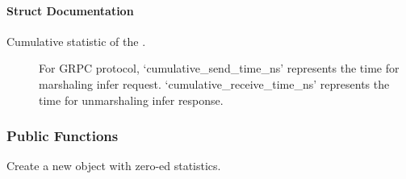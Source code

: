 \documentclass[letterpaper,10pt,english]{sphinxmanual}
\begin{document}
\paragraph{Struct Documentation}
\label{\detokenize{cpp_api/structnvidia_1_1inferenceserver_1_1client_1_1InferContext_1_1Stat:struct-documentation}}

\begin{fulllineitems}
\label{\detokenize{cpp_api/structnvidia_1_1inferenceserver_1_1client_1_1InferContext_1_1Stat:_CPPv4N6nvidia15inferenceserver6client12InferContext4StatE}}%
\pysigstartmultiline
{}\label{\detokenize{cpp_api/structnvidia_1_1inferenceserver_1_1client_1_1InferContext_1_1Stat:structnvidia_1_1inferenceserver_1_1client_1_1InferContext_1_1Stat}}%
\pysigstopmultiline
Cumulative statistic of the {\hyperref[\detokenize{cpp_api/classnvidia_1_1inferenceserver_1_1client_1_1InferContext:classnvidia_1_1inferenceserver_1_1client_1_1InferContext}]{}}. 

\begin{description}
\item[{}] \leavevmode
For GRPC protocol, ‘cumulative\_send\_time\_ns’ represents the time for marshaling infer request. ‘cumulative\_receive\_time\_ns’ represents the time for unmarshaling infer response. 

\end{description}

\subsubsection*{Public Functions}

\begin{fulllineitems}
\label{\detokenize{cpp_api/structnvidia_1_1inferenceserver_1_1client_1_1InferContext_1_1Stat:_CPPv4N6nvidia15inferenceserver6client12InferContext4Stat4StatEv}}%
\pysigstartmultiline
{}\label{\detokenize{cpp_api/structnvidia_1_1inferenceserver_1_1client_1_1InferContext_1_1Stat:structnvidia_1_1inferenceserver_1_1client_1_1InferContext_1_1Stat_1aa1c18a68160ee9ccb7002fdb40e7b15c}}%
\pysigstopmultiline
Create a new {\hyperref[\detokenize{cpp_api/structnvidia_1_1inferenceserver_1_1client_1_1InferContext_1_1Stat:structnvidia_1_1inferenceserver_1_1client_1_1InferContext_1_1Stat}]{}} object with zero-ed statistics. 


\end{fulllineitems}
\end{fulllineitems}
\end{document}
